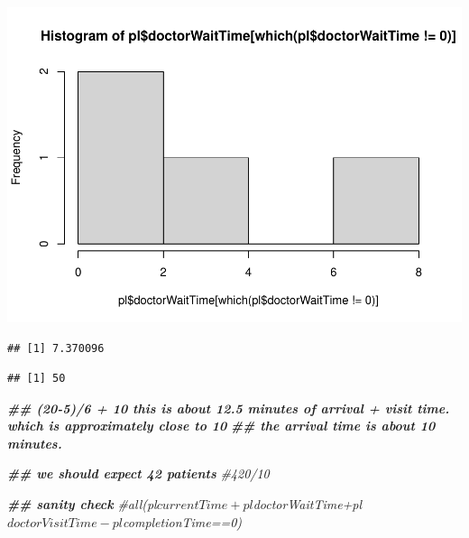\documentclass[
]{book}
\newenvironment{Shaded}{\begin{snugshade}}{\end{snugshade}}
\newcommand{\CommentTok}[1]{\textcolor[rgb]{0.56,0.35,0.01}{\textit{#1}}}
\newcommand{\DecValTok}[1]{\textcolor[rgb]{0.00,0.00,0.81}{#1}}
\newcommand{\DocumentationTok}[1]{\textcolor[rgb]{0.56,0.35,0.01}{\textbf{\textit{#1}}}}
\newcommand{\FunctionTok}[1]{\textcolor[rgb]{0.00,0.00,0.00}{#1}}
\newcommand{\NormalTok}[1]{#1}
\newcommand{\SpecialCharTok}[1]{\textcolor[rgb]{0.00,0.00,0.00}{#1}}
\theoremstyle{definition}
\theoremstyle{definition}
\theoremstyle{definition}
\theoremstyle{definition}
\theoremstyle{remark}
\begin{document}
\includegraphics{_main_files/figure-latex/unnamed-chunk-9-3.pdf}

\begin{Shaded}
\end{Shaded}

\begin{verbatim}
## [1] 7.370096
\end{verbatim}

\begin{Shaded}
\end{Shaded}

\begin{verbatim}
## [1] 50
\end{verbatim}

\begin{Shaded}
\begin{Highlighting}[]
\DocumentationTok{\#\# (20{-}5)/6 + 10 this is about 12.5 minutes of arrival + visit time. which is approximately close to 10 }
\DocumentationTok{\#\# the arrival time is about 10 minutes.  }

\DocumentationTok{\#\# we should expect 42 patients}
 \CommentTok{\#420/10}
  
  \DocumentationTok{\#\# sanity check}
  \CommentTok{\#all(pl$currentTime+pl$doctorWaitTime+pl$doctorVisitTime{-}pl$completionTime==0)}
\end{Highlighting}
\end{Shaded}
\end{document}
